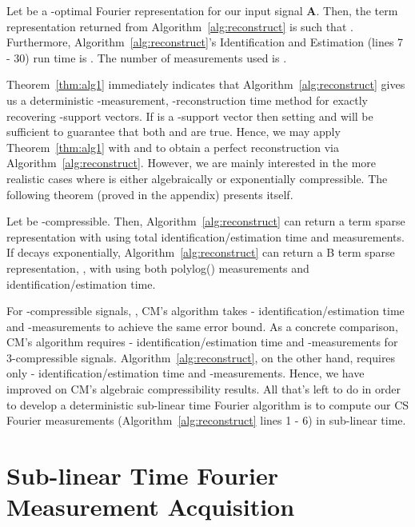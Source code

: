 \documentclass{article}
\begin{document}
\begin{Theorem}
Let  be a -optimal Fourier representation for our input signal \textbf{A}.  Then, the  term representation  returned from Algorithm~\ref{alg:reconstruct} is such that .  Furthermore, Algorithm~\ref{alg:reconstruct}'s Identification and Estimation (lines 7 - 30) run time is .  The number of measurements used is .
\label{thm:alg1}
\end{Theorem}

Theorem~\ref{thm:alg1} immediately indicates that Algorithm~\ref{alg:reconstruct} gives us a deterministic -measurement, -reconstruction time method for exactly recovering -support vectors.  If  is a -support vector then setting  and  will be sufficient to guarantee that both  and  are true.  Hence, we may apply Theorem~\ref{thm:alg1} with  and  to obtain a perfect reconstruction via Algorithm~\ref{alg:reconstruct}.  However, we are mainly interested in the more realistic cases where  is either algebraically or exponentially compressible.  The following theorem (proved in the appendix) presents itself.

\begin{Theorem}
Let  be -compressible.  Then, Algorithm~\ref{alg:reconstruct} can return a  term sparse representation  with  using  total identification/estimation time and  measurements.  If  decays exponentially, Algorithm~\ref{alg:reconstruct} can return a B term sparse representation, , with  using both  polylog() measurements and identification/estimation time.
\label{thm:compress}
\end{Theorem}

For -compressible signals, , CM's algorithm \cite{CMDetCS1,CMDetCS2} takes - identification/estimation time and -measurements to achieve the same error bound.  As a concrete comparison, CM's algorithm requires - identification/estimation time and -measurements for 3-compressible signals.  Algorithm~\ref{alg:reconstruct}, on the other hand, requires only - identification/estimation time and -measurements.  Hence, we have improved on CM's algebraic compressibility results.  All that's left to do in order to develop a deterministic sub-linear time Fourier algorithm is to compute our CS Fourier measurements (Algorithm~\ref{alg:reconstruct} lines 1 - 6) in sub-linear time.

\section{Sub-linear Time Fourier Measurement Acquisition}
\label{sec:fmeasure}
\end{document}
